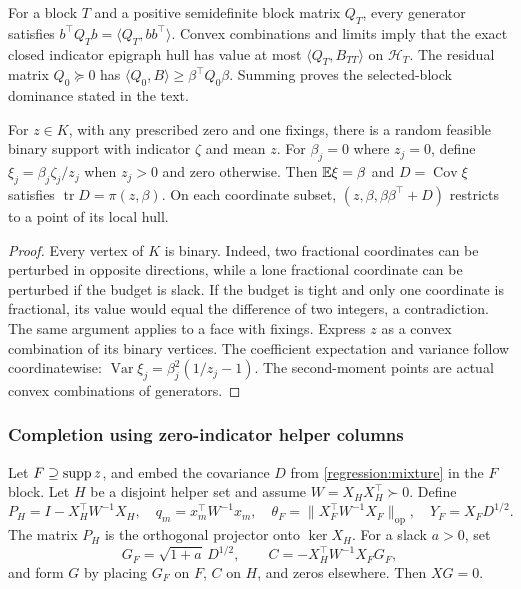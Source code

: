 For a block $T$ and a positive semidefinite block matrix $Q_T$,
every generator satisfies
$b^\top Q_Tb=\langle Q_T,bb^\top\rangle$.
Convex combinations and limits imply that the exact closed
indicator epigraph hull has value at most $\langle Q_T,B_{TT}\rangle$
on $\mathcal H_T$. The residual matrix $Q_0\succeq0$ has
$\langle Q_0,B\rangle\geq\beta^\top Q_0\beta$.
Summing proves the selected-block dominance stated in the text.

\begin{lemma}\label{regression:mixture}
For $z\in K$, with any prescribed zero and one fixings, there is a
random feasible binary support with indicator $\zeta$ and mean $z$.
For $\beta_j=0$ where $z_j=0$, define
$\xi_j=\beta_j\zeta_j/z_j$ when $z_j>0$ and zero otherwise.
Then $\mathbb{E}\xi=\beta$ and $D=\operatorname{Cov}\xi$ satisfies
$\operatorname{tr}D=\pi(z,\beta)$.
On each coordinate subset, $(z,\beta,\beta\beta^\top+D)$ restricts
to a point of its local hull.
\end{lemma}
\begin{proof}
Every vertex of $K$ is binary. Indeed, two fractional coordinates
can be perturbed in opposite directions, while a lone fractional
coordinate can be perturbed if the budget is slack. If the budget
is tight and only one coordinate is fractional, its value would
equal the difference of two integers, a contradiction.
The same argument applies to a face with fixings.
Express $z$ as a convex combination of its binary vertices.
The coefficient expectation and variance follow coordinatewise:
$\operatorname{Var}\xi_j=\beta_j^2(1/z_j-1)$.
The second-moment points are actual convex combinations of generators.
\end{proof}

\subsubsection{Completion using zero-indicator helper columns}
\label{app:regression:completion}

Let $F\supseteq\operatorname{supp} z$, and embed the covariance $D$ from
\cref{regression:mixture} in the $F$ block. Let $H$ be a disjoint
helper set and assume $W=X_HX_H^\top\succ0$. Define
\[
 P_H=I-X_H^\top W^{-1}X_H,\quad
 q_m=x_m^\top W^{-1}x_m,\quad
 \theta_F=\|X_F^\top W^{-1}X_F\|_{\mathrm{op}},\quad
 Y_F=X_FD^{1/2}.
\]
The matrix $P_H$ is the orthogonal projector onto $\ker X_H$.
For a slack $a>0$, set
\[
 G_F=\sqrt{1+a}\,D^{1/2},\qquad
 C=-X_H^\top W^{-1}X_FG_F,
\]
and form $G$ by placing $G_F$ on $F$, $C$ on $H$, and zeros
elsewhere. Then $XG=0$.


